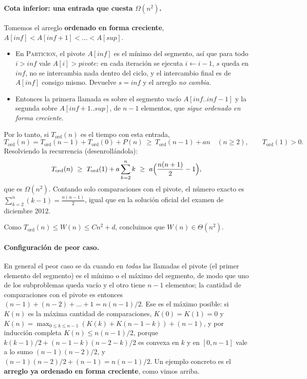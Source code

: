 \paragraph{Cota inferior: una entrada que cuesta $\Omega(n^2)$.} Tomemos el arreglo
\textbf{ordenado en forma creciente}, $A[\mathit{inf}]<A[\mathit{inf}+1]<\dots<A[\mathit{sup}]$.
\begin{itemize}
\item En \textsc{Particion}, el pivote $A[\mathit{inf}]$ es el mínimo del segmento, así que
para todo $i>\mathit{inf}$ vale $A[i]>pivote$: en cada iteración se ejecuta $i\gets i-1$,
$s$ queda en $\mathit{inf}$, no se intercambia nada dentro del ciclo, y el intercambio
final es de $A[\mathit{inf}]$ consigo mismo. Devuelve $s=\mathit{inf}$ y el arreglo
\emph{no cambia}.
\item Entonces la primera llamada es sobre el segmento vacío
$A[\mathit{inf}..\mathit{inf}-1]$ y la segunda sobre $A[\mathit{inf}+1..\mathit{sup}]$,
de $n-1$ elementos, que \emph{sigue ordenado en forma creciente}.
\end{itemize}
Por lo tanto, si $T_{\mathrm{ord}}(n)$ es el tiempo con esta entrada,
\[
T_{\mathrm{ord}}(n)=T_{\mathrm{ord}}(n-1)+T_{\mathrm{ord}}(0)+P(n)\ \ge\ T_{\mathrm{ord}}(n-1)+an
\quad(n\ge2),\qquad T_{\mathrm{ord}}(1)>0.
\]
Resolviendo la recurrencia (desenrollándola):
\[
T_{\mathrm{ord}}(n)\ \ge\ T_{\mathrm{ord}}(1)+a\sum_{k=2}^{n}k\ \ge\
a\Bigl(\frac{n(n+1)}{2}-1\Bigr),
\]
que es $\Omega(n^2)$. Contando solo comparaciones con el pivote, el número exacto es
$\sum_{k=2}^{n}(k-1)=\frac{n(n-1)}{2}$, igual que en la solución oficial del examen de
diciembre 2012.

Como $T_{\mathrm{ord}}(n)\le W(n)\le Cn^2+d$, concluimos que $W(n)\in\Theta(n^2)$.

\paragraph{Configuración de peor caso.} En general el peor caso se da cuando en
\emph{todas} las llamadas el pivote (el primer elemento del segmento) es el mínimo o el
máximo del segmento, de modo que uno de los subproblemas queda vacío y el otro tiene
$n-1$ elementos; la cantidad de comparaciones con el pivote es entonces
$(n-1)+(n-2)+\dots+1=n(n-1)/2$. Ese es el máximo posible: si $K(n)$ es la máxima cantidad
de comparaciones, $K(0)=K(1)=0$ y $K(n)=\max_{0\le k\le n-1}(K(k)+K(n-1-k))+(n-1)$, y por
inducción completa $K(n)\le n(n-1)/2$, porque $k(k-1)/2+(n-1-k)(n-2-k)/2$ es convexa en
$k$ y en $[0,n-1]$ vale a lo sumo $(n-1)(n-2)/2$, y $(n-1)(n-2)/2+(n-1)=n(n-1)/2$. Un ejemplo concreto es el
\textbf{arreglo ya ordenado en forma creciente}, como vimos arriba.

